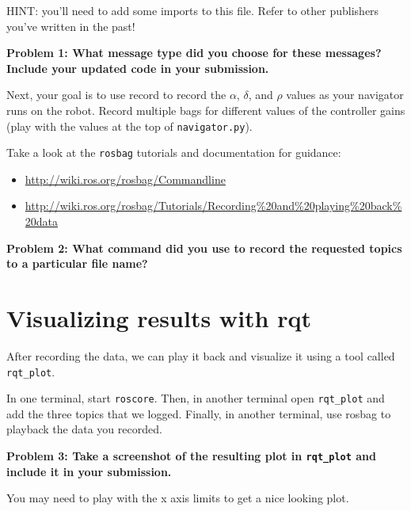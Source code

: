 \documentclass{article}
\begin{document}
HINT: you'll need to add some imports to this file. Refer to other publishers you've written in the past!

\textbf{Problem 1: What message type did you choose for these messages? Include your updated code in your submission.}

Next, your goal is to use record to record the $\alpha$, $\delta$, and $\rho$ values as your navigator runs on the robot. Record multiple bags for different values of the controller gains (play with the values at the top of \texttt{navigator.py}).

Take a look at the 
\texttt{rosbag} tutorials and documentation for guidance:
\begin{itemize}
    \item \url{http://wiki.ros.org/rosbag/Commandline}
    \item \url{http://wiki.ros.org/rosbag/Tutorials/Recording\%20and\%20playing\%20back\%20data}
\end{itemize}


\textbf{Problem 2: What command did you use to record the requested topics to a particular file name?}

\section{Visualizing results with rqt}
After recording the data, we can play it back and visualize it using a tool called \texttt{rqt\_plot}. 

In one terminal, start \texttt{roscore}. Then, in another terminal open \texttt{rqt\_plot} and add the three topics that we logged. Finally, in another terminal, use rosbag to playback the data you recorded. 

\textbf{Problem 3: Take a screenshot of the resulting plot in \texttt{rqt\_plot} and include it in your submission.}

You may need to play with the x axis limits to get a nice looking plot.
\end{document}
